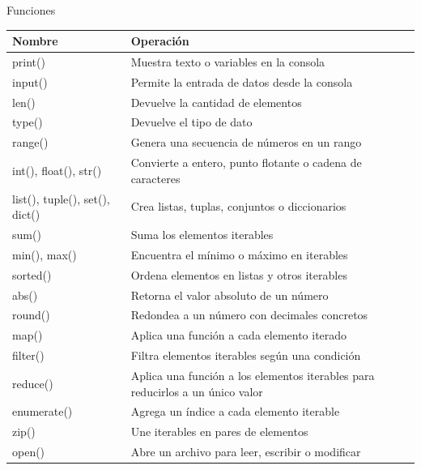 \documentclass[11pt]{beamer}
\begin{document}
\begin{frame}{Funciones}
	\scriptsize
	\begin{tabularx}{\linewidth}{>{\raggedright\arraybackslash}p{3.5cm} X}
		\toprule
		\textbf{Nombre} & \textbf{Operación} \\
		\midrule
		print() & Muestra texto o variables en la consola \\
		input() & Permite la entrada de datos desde la consola \\
		len() & Devuelve la cantidad de elementos \\
		type() & Devuelve el tipo de dato \\
		range() & Genera una secuencia de números en un rango \\
		int(), float(), str() & Convierte a entero, punto flotante o cadena de caracteres \\
		list(), tuple(), set(), dict() & Crea listas, tuplas, conjuntos o diccionarios \\
		sum() & Suma los elementos iterables \\
		min(), max() & Encuentra el mínimo o máximo en iterables \\
		sorted() & Ordena elementos en listas y otros iterables \\
		abs() & Retorna el valor absoluto de un número \\
		round() & Redondea a un número con decimales concretos \\
		map() & Aplica una función a cada elemento iterado \\
		filter() & Filtra elementos iterables según una condición \\
		reduce() & Aplica una función a los elementos iterables para reducirlos a un único valor \\
		enumerate() & Agrega un índice a cada elemento iterable \\
		zip() & Une iterables en pares de elementos \\ 
		open() & Abre un archivo para leer, escribir o modificar \\
		\bottomrule
	\end{tabularx}
\end{frame}
\end{document}
